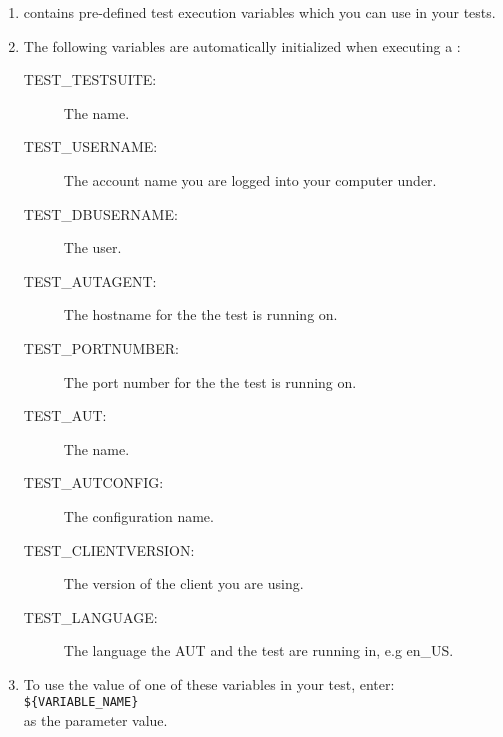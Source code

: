 \begin{enumerate}
\item \app{} contains pre-defined test execution variables which you can use in your tests. 
\item The following variables are automatically initialized when executing a \gdsuite{}:
 \begin{description}
 \item [TEST\_TESTSUITE:]{The \gdsuite{} name.}
 \item [TEST\_USERNAME:]{The account name you are logged into your computer under.}
 \item [TEST\_DBUSERNAME:]{The \gddb{} user.}
 \item [TEST\_AUTAGENT:]{The hostname for the \gdagent{} the test is running on.}
 \item [TEST\_PORTNUMBER:]{The port number for the \gdagent{} the test is running on.}
 \item [TEST\_AUT:]{The \gdaut{} name.}
 \item [TEST\_AUTCONFIG:]{The \gdaut{} configuration name.}
 \item [TEST\_CLIENTVERSION:]{The version of the \app{} client you are using.}
 \item [TEST\_LANGUAGE:]{The language the AUT and the test are running in, e.g en\_US. }
 \end{description}
\item To use the value of one of these variables in your test, enter: \\
\verb+${VARIABLE_NAME}+\\
as the parameter value. 
\end{enumerate}

